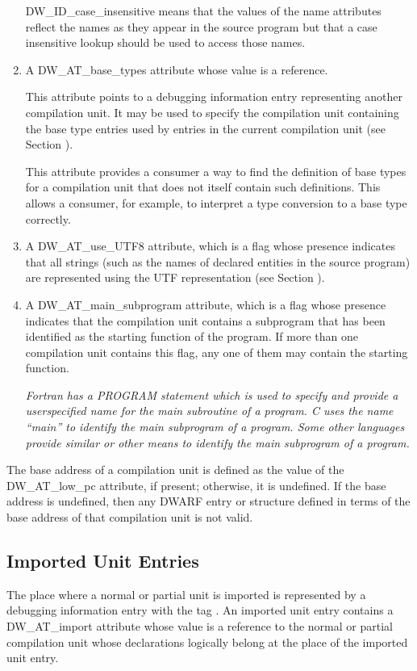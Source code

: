\begin{enumerate}[1]
DW\_ID\_case\_insensitive means that the values of the name
attributes reflect the names as they appear in the source
program but that a case insensitive lookup should be used to
access those names.

\item A DW\_AT\_base\_types attribute whose value is a reference.

This attribute points to a debugging information entry
representing another compilation unit.  It may be used
to specify the compilation unit containing the base type
entries used by entries in the current compilation unit
(see Section ).

This attribute provides a consumer a way to find the definition
of base types for a compilation unit that does not itself
contain such definitions. This allows a consumer, for example,
to interpret a type conversion to a base type correctly.

\item A DW\_AT\_use\_UTF8 attribute, which is a flag whose
presence indicates that all strings (such as the names of
declared entities in the source program) are represented
using the UTF representation 
(see Section ).


\item A DW\_AT\_main\_subprogram attribute, which is a flag
whose presence indicates that the compilation unit contains a
subprogram that has been identified as the starting function
of the program. If more than one compilation unit contains
this flag, any one of them may contain the starting function.

\textit{Fortran has a PROGRAM statement which is used
to specify and provide a user\dash specified name for the main
subroutine of a program. C uses the name “main” to identify
the main subprogram of a program. Some other languages provide
similar or other means to identify the main subprogram of
a program.}

\end{enumerate}

The  base address of a compilation unit is defined as the
value of the DW\_AT\_low\_pc attribute, if present; otherwise,
it is undefined. If the base address is undefined, then any
DWARF entry or structure defined in terms of the base address
of that compilation unit is not valid.


\subsection{Imported Unit Entries}
\label{chap:importedunitentries}
The place where a normal or partial unit is imported is
represented by a debugging information entry with the 
tag . 
An imported unit entry contains a
DW\_AT\_import attribute whose value is a reference to the
normal or partial compilation unit whose declarations logically
belong at the place of the imported unit entry.

